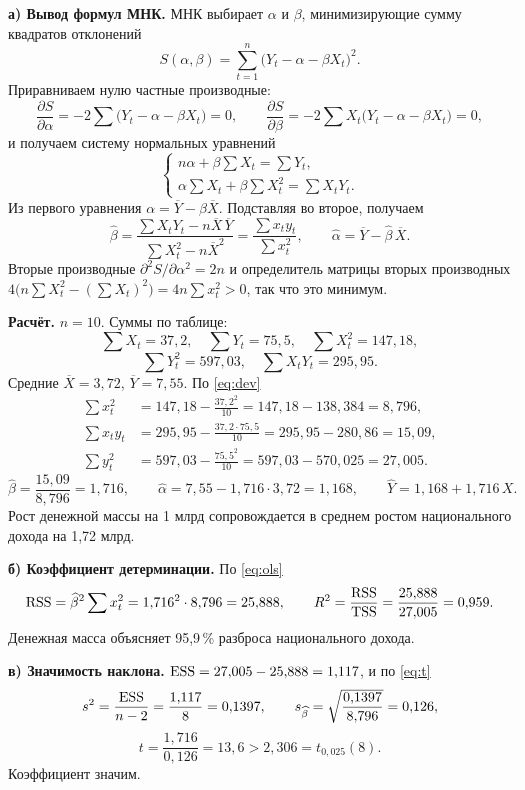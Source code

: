 \begin{solution}
\textbf{а) Вывод формул МНК.} МНК выбирает $\alpha$ и $\beta$, минимизирующие
сумму квадратов отклонений
\[
  S(\alpha, \beta) = \sum_{t=1}^{n}\bigl(Y_t - \alpha - \beta X_t\bigr)^2 .
\]
Приравниваем нулю частные производные:
\[
  \frac{\partial S}{\partial\alpha} = -2\sum\bigl(Y_t - \alpha - \beta X_t\bigr) = 0,
  \qquad
  \frac{\partial S}{\partial\beta} = -2\sum X_t\bigl(Y_t - \alpha - \beta X_t\bigr) = 0,
\]
и получаем систему нормальных уравнений
\[
  \begin{cases}
    n\alpha + \beta\sum X_t = \sum Y_t, \\[2pt]
    \alpha\sum X_t + \beta\sum X_t^2 = \sum X_tY_t .
  \end{cases}
\]
Из первого уравнения $\alpha = \overline{Y} - \beta\overline{X}$. Подставляя
во второе, получаем
\[
  \widehat{\beta} = \frac{\sum X_tY_t - n\overline{X}\,\overline{Y}}{\sum X_t^2 - n\overline{X}^2}
                  = \frac{\sum x_ty_t}{\sum x_t^2},
  \qquad
  \widehat{\alpha} = \overline{Y} - \widehat{\beta}\,\overline{X}.
\]
Вторые производные $\partial^2S/\partial\alpha^2 = 2n$ и определитель матрицы
вторых производных $4\bigl(n\sum X_t^2 - (\sum X_t)^2\bigr) = 4n\sum x_t^2 > 0$,
так что это минимум.

\textbf{Расчёт.} $n = 10$. Суммы по таблице:
\[
  \sum X_t = 37{,}2,\quad \sum Y_t = 75{,}5,\quad \sum X_t^2 = 147{,}18,
\]
\[
  \sum Y_t^2 = 597{,}03,\quad \sum X_tY_t = 295{,}95 .
\]
Средние $\overline{X} = 3{,}72$, $\overline{Y} = 7{,}55$. По \eqref{eq:dev}
\[
\begin{aligned}
  \sum x_t^2  &= 147{,}18 - \frac{37{,}2^2}{10} = 147{,}18 - 138{,}384 = 8{,}796, \\
  \sum x_ty_t &= 295{,}95 - \frac{37{,}2\cdot 75{,}5}{10} = 295{,}95 - 280{,}86 = 15{,}09, \\
  \sum y_t^2  &= 597{,}03 - \frac{75{,}5^2}{10} = 597{,}03 - 570{,}025 = 27{,}005 .
\end{aligned}
\]
\[
  \widehat{\beta} = \frac{15{,}09}{8{,}796} = 1{,}716,
  \qquad
  \widehat{\alpha} = 7{,}55 - 1{,}716\cdot 3{,}72 = 1{,}168,
  \qquad
  \widehat{Y} = 1{,}168 + 1{,}716\,X .
\]
Рост денежной массы на 1 млрд сопровождается в среднем ростом
национального дохода на 1,72 млрд.

\medskip
\textbf{б) Коэффициент детерминации.} По \eqref{eq:ols}
\[
  \mathrm{RSS} = \widehat{\beta}^2\sum x_t^2 = 1{,}716^2\cdot 8{,}796 = 25{,}888,
  \qquad
  R^2 = \frac{\mathrm{RSS}}{\mathrm{TSS}} = \frac{25{,}888}{27{,}005} = 0{,}959 .
\]
Денежная масса объясняет 95,9\,\% разброса национального дохода.

\medskip
\textbf{в) Значимость наклона.} $\mathrm{ESS} = 27{,}005 - 25{,}888 = 1{,}117$, и по
\eqref{eq:t}
\[
  s^2 = \frac{\mathrm{ESS}}{n-2} = \frac{1{,}117}{8} = 0{,}1397,
  \qquad
  s_{\widehat{\beta}} = \sqrt{\frac{0{,}1397}{8{,}796}} = 0{,}126,
\]
\[
  t = \frac{1{,}716}{0{,}126} = 13{,}6 > 2{,}306 = t_{0{,}025}(8).
\]
Коэффициент значим.
\end{solution}

